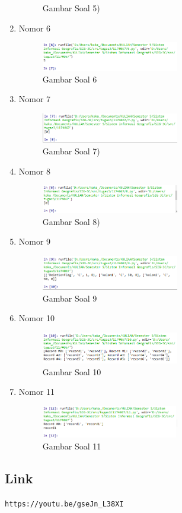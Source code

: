 \begin{enumerate}
\begin{figure}[H]
		\centering
		\caption{Gambar Soal 5)}
	\end{figure}
	\item Nomor 6
	
	\begin{figure}[H]
		\includegraphics[width=6cm]{figures/Tugas3/1174067/6.png}
		\centering
		\caption{Gambar Soal 6}
	\end{figure}
	\item Nomor 7
	
	\begin{figure}[H]
		\includegraphics[width=6cm]{figures/Tugas3/1174067/7.png}
		\centering
		\caption{Gambar Soal 7)}
	\end{figure}
	\item Nomor 8
	
	\begin{figure}[H]
		\includegraphics[width=6cm]{figures/Tugas3/1174067/8.png}
		\centering
		\caption{Gambar Soal 8)}
	\end{figure}
	\item Nomor 9
	
	\begin{figure}[H]
		\includegraphics[width=6cm]{figures/Tugas3/1174067/9.png}
		\centering
		\caption{Gambar Soal 9}
	\end{figure}
	\item Nomor 10
	
	\begin{figure}[H]
		\includegraphics[width=6cm]{figures/Tugas3/1174067/10.png}
		\centering
		\caption{Gambar Soal 10 }
	\end{figure}
	\item Nomor 11
	
	\begin{figure}[H]
		\includegraphics[width=6cm]{figures/Tugas3/1174067/11.png}
		\centering
		\caption{Gambar Soal 11 }
	\end{figure}
\end{enumerate}
\subsection{Link}
\verb|https://youtu.be/gseJn_L38XI|